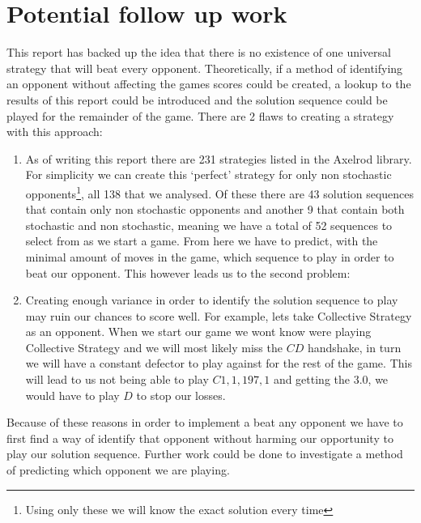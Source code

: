 \section{Potential follow up work}
This report has backed up the idea that there is no existence of one universal strategy that will beat every opponent.
Theoretically, if a method of identifying an opponent without affecting the games scores could be created, a lookup to the results of this report could be introduced and the solution sequence could be played for the remainder of the game.
There are 2 flaws to creating a strategy with this approach:
\begin{enumerate}
    \item {As of writing this report there are 231 strategies listed in the Axelrod library.
    For simplicity we can create this `perfect' strategy for only non stochastic opponents\footnote{Using only these we will know the exact solution every time}, all 138 that we analysed.
    Of these there are 43 solution sequences that contain only non stochastic opponents and another 9 that contain both stochastic and non stochastic, meaning we have a total of 52 sequences to select from as we start a game.
    From here we have to predict, with the minimal amount of moves in the game, which sequence to play in order to beat our opponent.
    This however leads us to the second problem:}

    \item {Creating enough variance in order to identify the solution sequence to play may  ruin our chances to score well.
    For example, lets take Collective Strategy as an opponent.
    When we start our game we wont know were playing Collective Strategy and we will most likely miss the $CD$ handshake, in turn we will have a constant defector to play against for the rest of the game.
    This will lead to us not being able to play $C1,1,197,1$ and getting the $3.0$, we would have to play $D$ to stop our losses.}
\end{enumerate}

Because of these reasons in order to implement a beat any opponent we have to first find a way of identify that opponent without harming our opportunity to play our solution sequence. 
Further work could be done to investigate a method of predicting which opponent we are playing.